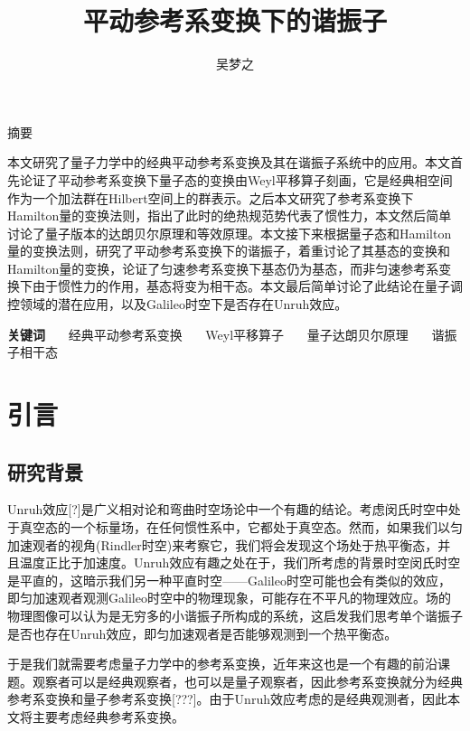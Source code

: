 \documentclass[a4paper]{article}
\title{平动参考系变换下的谐振子}
\author{吴梦之}
\begin{document}
    \maketitle

    \begin{center}
        \fontsize{18pt}{0}摘\quad\quad 要
    \end{center}

        本文研究了量子力学中的经典平动参考系变换及其在谐振子系统中的应用。本文首先论证了平动参考系变换下量子态的变换由Weyl平移算子刻画，它是经典相空间作为一个加法群在Hilbert空间上的群表示。之后本文研究了参考系变换下Hamilton量的变换法则，指出了此时的绝热规范势代表了惯性力，本文然后简单讨论了量子版本的达朗贝尔原理和等效原理。本文接下来根据量子态和Hamilton量的变换法则，研究了平动参考系变换下的谐振子，着重讨论了其基态的变换和Hamilton量的变换，论证了匀速参考系变换下基态仍为基态，而非匀速参考系变换下由于惯性力的作用，基态将变为相干态。本文最后简单讨论了此结论在量子调控领域的潜在应用，以及Galileo时空下是否存在Unruh效应。

    \textbf{关键词} \ \ \ 经典平动参考系变换 \ \ \ Weyl平移算子 \ \ \ 量子达朗贝尔原理 \ \ \ 谐振子相干态



    \section{引言}

    \subsection{研究背景}

        Unruh效应[?]是广义相对论和弯曲时空场论中一个有趣的结论。考虑闵氏时空中处于真空态的一个标量场，在任何惯性系中，它都处于真空态。然而，如果我们以匀加速观者的视角(Rindler时空)来考察它，我们将会发现这个场处于热平衡态，并且温度正比于加速度。Unruh效应有趣之处在于，我们所考虑的背景时空闵氏时空是平直的，这暗示我们另一种平直时空——Galileo时空可能也会有类似的效应，即匀加速观者观测Galileo时空中的物理现象，可能存在不平凡的物理效应。场的物理图像可以认为是无穷多的小谐振子所构成的系统，这启发我们思考单个谐振子是否也存在Unruh效应，即匀加速观者是否能够观测到一个热平衡态。

        于是我们就需要考虑量子力学中的参考系变换，近年来这也是一个有趣的前沿课题。观察者可以是经典观察者，也可以是量子观察者，因此参考系变换就分为经典参考系变换和量子参考系变换[???]。由于Unruh效应考虑的是经典观测者，因此本文将主要考虑经典参考系变换。
\end{document}

